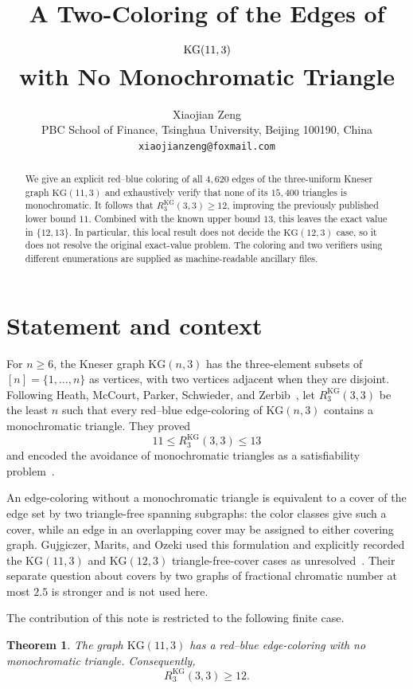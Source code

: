\documentclass[11pt]{article}
\title{A Two-Coloring of the Edges of $\KG(11,3)$\\
with No Monochromatic Triangle}
\author{Xiaojian Zeng\\
PBC School of Finance, Tsinghua University, Beijing 100190, China\\
\texttt{xiaojianzeng@foxmail.com}}
\date{}
\newtheorem{theorem}{Theorem}
\newcommand{\KG}{\mathrm{KG}}
\newcommand{\KGR}{R^{\mathrm{KG}}_{3}(3,3)}
\begin{document}
\maketitle

\begin{abstract}
We give an explicit red--blue coloring of all $4{,}620$ edges of the
three-uniform Kneser graph $\KG(11,3)$ and exhaustively verify that none of
its $15{,}400$ triangles is monochromatic.  It follows that
$R^{\mathrm{KG}}_{3}(3,3)\geq 12$, improving the previously published lower
bound $11$.  Combined with the known upper bound $13$, this leaves the exact
value in $\{12,13\}$.  In particular, this local result does not decide the
$\KG(12,3)$ case, so it does not resolve the original exact-value problem.
The coloring and two verifiers using different enumerations are supplied as
machine-readable ancillary files.
\end{abstract}

\section{Statement and context}

For $n\geq 6$, the Kneser graph $\KG(n,3)$ has the three-element subsets of
$[n]=\{1,\ldots,n\}$ as vertices, with two vertices adjacent when they are
disjoint.  Following Heath, McCourt, Parker, Schwieder, and
Zerbib~\cite{HeathEtAl2025}, let $\KGR$ be the least $n$ such that every red--blue
edge-coloring of $\KG(n,3)$ contains a monochromatic triangle.  They proved
\[
  11\leq \KGR\leq 13
\]
and encoded the avoidance of monochromatic triangles as a satisfiability
problem~\cite[Theorems 11--12 and Section 3.3]{HeathEtAl2025}.

An edge-coloring without a monochromatic triangle is equivalent to a cover
of the edge set by two triangle-free spanning subgraphs: the color classes
give such a cover, while an edge in an overlapping cover may be assigned to
either covering graph.  Gujgiczer, Marits, and Ozeki used this formulation
and explicitly recorded the $\KG(11,3)$ and $\KG(12,3)$ triangle-free-cover
cases as unresolved~\cite[Section 4]{GujgiczerEtAl2026}.  Their separate
question about covers by two graphs of fractional chromatic number at most
$2.5$ is stronger and is not used here.

The contribution of this note is restricted to the following finite case.

\begin{theorem}\label{thm:main}
The graph $\KG(11,3)$ has a red--blue edge-coloring with no monochromatic
triangle.  Consequently,
\[
  R^{\mathrm{KG}}_{3}(3,3)\geq 12.
\]
\end{theorem}
\end{document}

